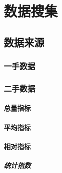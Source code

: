 \documentclass[12pt]{book}
\begin{document}
\chapter{数据搜集}


\section{数据来源}



\subsection{一手数据}




\subsection{二手数据}


\subsubsection{总量指标}

\subsubsection{平均指标}

\subsubsection{相对指标}


\paragraph{统计指数}
\end{document}
